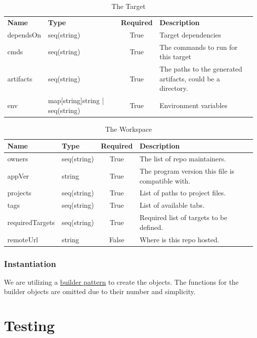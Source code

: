 \documentclass[11pt]{article}
\begin{document}
\begin{table}[h!]
  \centering
  \begin{tabular}[h!]{l | p{3cm} | c | p{7cm}}
    \textbf{Name} & \textbf{Type} & \textbf{Required} & \textbf{Description}\\
    dependsOn & seq(string) & True & Target dependencies\\
    \hline
    cmds & seq(string) & True & The commands to run for this target\\
    \hline
    artifacts & seq(string) & True & The paths to the generated artifacts, could
                                     be a directory.\\
    \hline
    env & map[string]string | seq(string) & True & Environment variables
  \end{tabular}
  \caption{The Target}
  \label{table:target}
\end{table}

\begin{table}[h!]
  \centering
  \begin{tabular}[h!]{l | l | c | l}
    \textbf{Name} & \textbf{Type} & \textbf{Required} & \textbf{Description}\\
    \hline
    owners & seq(string) & True & The list of repo maintainers.\\
    \hline
    appVer & string & True & The program version this file is compatible with.\\
    \hline
    projects & seq(string) & True & List of paths to project files.\\
    \hline
    tags & seq(string) & True & List of available tabs.\\
    \hline
    requiredTargets & seq(string) & True & Required list of targets to be
                                           defined.\\
    \hline
    remoteUrl & string & False & Where is this repo hosted.
  \end{tabular}
  \caption{The Workspace}
  \label{table:workspace}
\end{table}

\subsubsection{Instantiation}
We are utilizing a
\href{https://en.wikipedia.org/wiki/Builder\_pattern}{builder pattern} to
create the objects. The functions for the builder objects are omitted due to
their number and simplicity.

\section{Testing}
\end{document}
